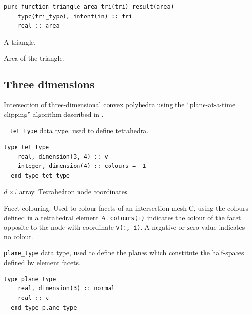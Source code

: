 \documentclass{article}
\begin{document}
\begin{lstlisting}[language=FORTRAN]
  pure function triangle_area_tri(tri) result(area)
    type(tri_type), intent(in) :: tri
    real :: area
\end{lstlisting}

\begin{description}[font=\ttfamily\bfseries,leftmargin=2.2\parindent,labelindent=1.7\parindent,noitemsep]
  \item[tri] A triangle.
  \item[area] Area of the triangle.
\end{description}

\subsection{Three dimensions}\label{sect:3D_intersection}

Intersection of three-dimensional convex polyhedra using the ``plane-at-a-time
clipping'' algorithm described in \citet[][section 2.4.3]{eberly2007}.

~\newline
\verb+tet_type+ data type, used to define tetrahedra.

\begin{lstlisting}[language=FORTRAN]
  type tet_type
    real, dimension(3, 4) :: v
    integer, dimension(4) :: colours = -1
  end type tet_type
\end{lstlisting}

\begin{description}[font=\ttfamily\bfseries,leftmargin=2.2\parindent,labelindent=1.7\parindent,noitemsep]
  \item[v] $d \times l$ array. Tetrahedron node coordinates.
  \item[colours] Facet colouring. Used to colour facets of an intersection mesh
    C, using the colours defined in a tetrahedral element A. \verb+colours(i)+
    indicates the colour of the facet opposite to the node with coordinate
    \verb+v(:, i)+. A negative or zero value indicates no colour.
\end{description}

\noindent \verb+plane_type+ data type, used to define the planes which
constitute the half-spaces defined by element facets.

\begin{lstlisting}[language=FORTRAN]
  type plane_type
    real, dimension(3) :: normal
    real :: c
  end type plane_type
\end{lstlisting}
\end{document}
